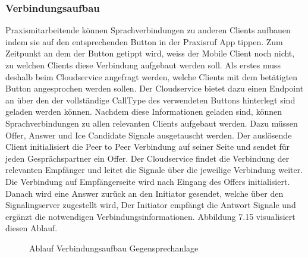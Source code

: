 \clearpage

\subsubsection{Verbindungsaufbau}

Praxismitarbeitende können Sprachverbindungen zu anderen Clients aufbauen indem sie auf den entsprechenden Button in der Praxisruf App tippen.
Zum Zeitpunkt an dem der Button getippt wird, weiss der Mobile Client noch nicht, zu welchen Clients diese Verbindung aufgebaut werden soll.
Als erstes muss deshalb beim Cloudservice angefragt werden, welche Clients mit dem betätigten Button angesprochen werden sollen.
Der Cloudservice bietet dazu einen Endpoint an über den der vollständige CallType des verwendeten Buttons hinterlegt sind geladen werden können.
Nachdem diese Informationen geladen sind, können Sprachverbindungen zu allen relevanten Clients aufgebaut werden.
Dazu müssen Offer, Answer und Ice Candidate Signale ausgetauscht werden.
Der auslösende Client initialisiert die Peer to Peer Verbindung auf seiner Seite und sendet für jeden Gesprächspartner ein Offer.
Der Cloudservice findet die Verbindung der relevanten Empfänger und leitet die Signale über die jeweilige Verbindung weiter.
Die Verbindung auf Empfängerseite wird nach Eingang des Offers initialisiert.
Danach wird eine Answer zurück an den Initiator gesendet, welche über den Signalingserver zugestellt wird,
Der Initiator empfängt die Antwort Signale und ergänzt die notwendigen Verbindungsinformationen.
Abbildung 7.15 visualisiert diesen Ablauf.

\begin{figure}[h]
    \centering
    \begin{minipage}[b]{0.9\textwidth}
        \caption{Ablauf Verbindungsaufbau Gegensprechanlage}
    \end{minipage}
\end{figure}

